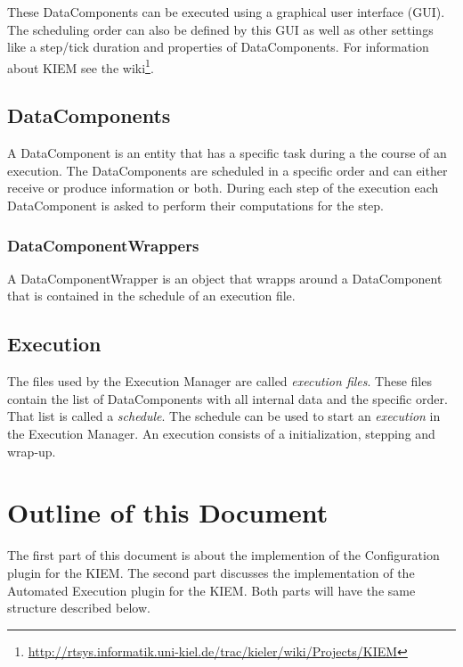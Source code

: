 These DataComponents can be executed using a graphical user interface (GUI). 
The scheduling order can also be defined by this GUI as well as other settings like a step/tick duration and properties of DataComponents.
For information about \ac{KIEM} see the wiki\footnote{\url{http://rtsys.informatik.uni-kiel.de/trac/kieler/wiki/Projects/KIEM}}.

\subsection{DataComponents}
\label{section:IntroDataComponent}
A DataComponent is an entity that has a specific task during a the course of an execution. The
DataComponents are scheduled in a specific order and can either receive or produce information or both. 
During each step of the execution each DataComponent is asked to perform their computations for the step.

\subsubsection{DataComponentWrappers}
\label{section:IntroDataComponentWrapper}
A DataComponentWrapper is an object that wrapps around a DataComponent that is contained in the schedule
of an execution file.


\subsection{Execution}
\label{section:IntroExecution}
The files used by the Execution Manager are called \textit{execution files}. These files contain 
the list of DataComponents with all internal data and the specific order. That list is called a
\textit{schedule}. The schedule can be used to start an \textit{execution} in the Execution Manager.
An execution consists of a initialization, stepping and wrap-up.


\section{Outline of this Document}
\label{sec:introOutline}
The first part of this document is about the implemention of the Configuration plugin for the \ac{KIEM}.
The second part discusses the implementation of the Automated Execution plugin for the \ac{KIEM}. Both
parts will have the same structure described below.

